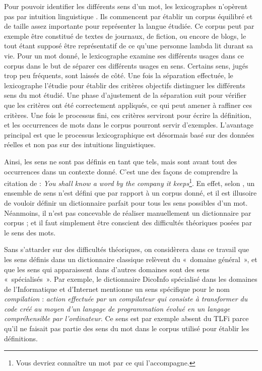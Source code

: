 Pour pouvoir identifier les différents sens d'un mot, les lexicographes
n'opèrent pas par intuition linguistique \citep{kilgarriff1997don}. Ils
commencent par établir un corpus équilibré et de taille assez importante pour
représenter la langue étudiée. Ce corpus peut par exemple être constitué de
textes de journaux, de fiction, ou encore de blogs, le tout étant supposé être
représentatif de ce qu'une personne lambda lit durant sa vie. Pour un mot
donné, le lexicographe examine ses différents usages dans ce corpus dans le but
de séparer ces différents usages en sens. Certains sens, jugés trop peu
fréquents, sont laissés de côté. Une fois la séparation effectuée, le
lexicographe l'étudie pour établir des critères objectifs distinguer les
différents sens du mot étudié. Une phase d'ajustement de la séparation suit
pour vérifier que les critères ont été correctement appliqués, ce qui peut
amener à raffiner ces critères. Une fois le processus fini, ces critères
serviront pour écrire la définition, et les occurrences de mots dans le corpus
pourront servir d'exemples. L'avantage principal est que le processus
lexicographique est désormais basé sur des données réelles et non pas sur des
intuitions linguistiques.


Ainsi, les sens ne sont pas définis en tant que tels, mais sont avant tout des
occurrences dans un contexte donné. C'est une des façons de comprendre la
citation de \citep{firth1957synopsys} : \emph{You shall know a word by the
company it keeps}\footnote{Vous devriez connaître un mot par ce qui
l'accompagne.}. En effet, selon \citep{kilgarriff1997don}, un ensemble de sens
n'est défini que par rapport à un corpus donné, et il est illusoire de vouloir
définir un dictionnaire parfait pour tous les sens possibles d'un mot.
Néanmoins, il n'est pas concevable de réaliser manuellement un dictionnaire par
corpus ; et il faut simplement être conscient des difficultés théoriques posées
par le sens des mots.

Sans s'attarder sur des difficultés théoriques, on considèrera dans ce travail
que les sens définis dans un dictionnaire classique relèvent du «~domaine
général~», et que les sens qui apparaissent dans d'autres domaines sont des
sens «~spécialisés~». Par exemple, le dictionnaire DicoInfo \citep{corpusolst}
spécialisé dans les domaines de l'Informatique et d'Internet mentionne un sens
spécifique pour le nom \emph{compilation} : \emph{action effectuée par un
compilateur qui consiste à transformer du code créé au moyen d'un langage de
programmation évolué en un langage compréhensible par l'ordinateur}. Ce sens
est par exemple absent du TLFi \citep{TLFi} parce qu'il ne faisait pas partie
des sens du mot dans le corpus utilisé pour établir les définitions.

